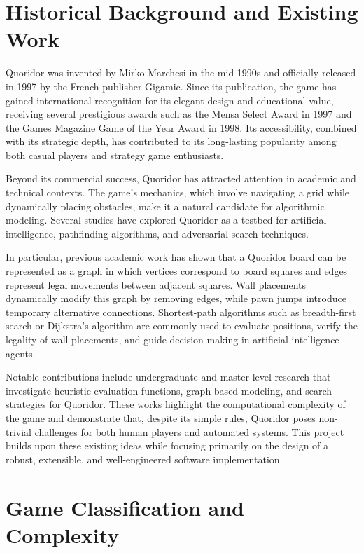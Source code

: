 \documentclass[a4paper]{article}
\begin{document}
\section{Historical Background and Existing Work}

Quoridor was invented by Mirko Marchesi in the mid-1990s and officially
released in 1997 by the French publisher Gigamic. Since its publication, the
game has gained international recognition for its elegant design and
educational value, receiving several prestigious awards such as the Mensa
Select Award in 1997 and the Games Magazine Game of the Year Award in 1998. Its
accessibility, combined with its strategic depth, has contributed to its
long-lasting popularity among both casual players and strategy game
enthusiasts.

Beyond its commercial success, Quoridor has attracted attention in academic
and technical contexts. The game's mechanics, which involve navigating a grid
while dynamically placing obstacles, make it a natural candidate for
algorithmic modeling. Several studies have explored Quoridor as a testbed for
artificial intelligence, pathfinding algorithms, and adversarial search
techniques.

In particular, previous academic work has shown that a Quoridor board can be
represented as a graph in which vertices correspond to board squares and edges
represent legal movements between adjacent squares. Wall placements
dynamically modify this graph by removing edges, while pawn jumps introduce
temporary alternative connections. Shortest-path algorithms such as
breadth-first search or Dijkstra's algorithm are commonly used to evaluate
positions, verify the legality of wall placements, and guide decision-making
in artificial intelligence agents.

Notable contributions include undergraduate and master-level research that
investigate heuristic evaluation functions, graph-based modeling, and search
strategies for Quoridor. These works highlight the computational complexity of
the game and demonstrate that, despite its simple rules, Quoridor poses
non-trivial challenges for both human players and automated systems. This
project builds upon these existing ideas while focusing primarily on the
design of a robust, extensible, and well-engineered software implementation.

\section{Game Classification and Complexity}
\end{document}

